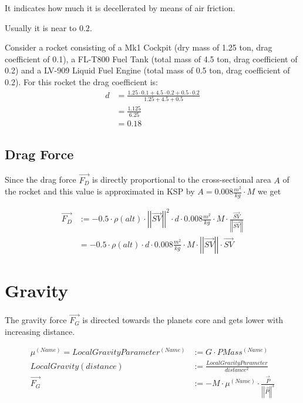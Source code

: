 \documentclass[11pt]{report}
\newcommand{\oa}[1]{\overrightarrow{#1}}
\newcommand{\F}[1]{\oa{F_{#1}}}
\newcommand{\Pos}{\oa{P}}
\newcommand{\absvec}[1]{\left|\left|{#1}\right|\right|}
\begin{document}
It indicates how much it is decellerated by means of air friction.

Usually it is near to $0.2$.

Consider a rocket consisting of a Mk1 Cockpit (dry mass of 1.25 ton,
drag coefficient of 0.1), a FL-T800 Fuel Tank (total mass of 4.5 ton,
drag coefficient of 0.2) and a LV-909 Liquid Fuel Engine (total mass
of 0.5 ton, drag coefficient of 0.2). For this rocket the drag
coefficient is:
\begin{align}
  d &= \frac{1.25 \cdot 0.1 + 4.5 \cdot 0.2 + 0.5 \cdot 0.2}{ 1.25 + 4.5 + 0.5 }\nonumber\\
  &= \frac{1.125}{6.25}\nonumber\\
  &= 0.18\nonumber
\end{align}

\subsection{Drag Force}\label{DragForce}

Since the drag force $\F{D}$ is directly proportional to the
cross-sectional area $A$ of the rocket and this value is approximated
in KSP by $A = 0.008 \frac{m^2}{kg} \cdot M$ we get

\begin{align}
  \F{D} &:= - 0.5 \cdot \rho(alt)\cdot \absvec{\oa{SV}}^2\cdot d \cdot 0.008\frac{m^2}{kg} \cdot M \cdot \frac{\oa{SV}}{\absvec{\oa{SV}}} \nonumber\\
  &= - 0.5 \cdot \rho(alt)\cdot d \cdot 0.008\frac{m^2}{kg} \cdot M \cdot \absvec{\oa{SV}} \cdot \oa{SV}
\end{align}

\section{Gravity}

The  gravity force $\F{G}$ is directed towards the
planets core and gets lower with increasing distance.

\begin{align}
  \mu^{(Name)} = LocalGravityParameter^{(Name)} &:= G \cdot PMass^{(Name)} \nonumber\\
  LocalGravity(distance) &:= \frac{LocalGravityParameter}{distance^2}\label{LocalGravityEquation}\\
  \F{G} &:= - M \cdot \mu^{(Name)}\cdot\frac{\Pos}{\absvec{\Pos}^3}
\end{align}
\end{document}
